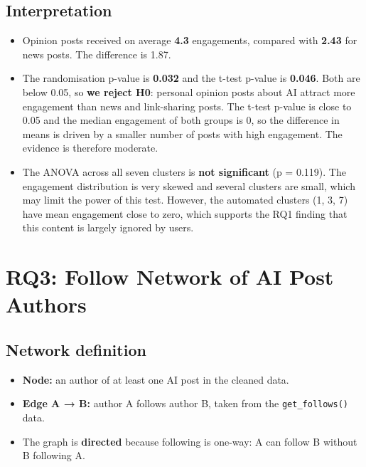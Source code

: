 \documentclass[
  10pt,
]{article}
\providecommand{\tightlist}{%
  \setlength{\itemsep}{0pt}\setlength{\parskip}{0pt}}
\begin{document}
\subsection{Interpretation}\label{interpretation-1}

\begin{itemize}
\tightlist
\item
  Opinion posts received on average \textbf{4.3} engagements, compared
  with \textbf{2.43} for news posts. The difference is 1.87.
\item
  The randomisation p-value is \textbf{0.032} and the t-test p-value is
  \textbf{0.046}. Both are below 0.05, so \textbf{we reject H0}:
  personal opinion posts about AI attract more engagement than news and
  link-sharing posts. The t-test p-value is close to 0.05 and the median
  engagement of both groups is 0, so the difference in means is driven
  by a smaller number of posts with high engagement. The evidence is
  therefore moderate.
\item
  The ANOVA across all seven clusters is \textbf{not significant} (p =
  0.119). The engagement distribution is very skewed and several
  clusters are small, which may limit the power of this test. However,
  the automated clusters (1, 3, 7) have mean engagement close to zero,
  which supports the RQ1 finding that this content is largely ignored by
  users.
\end{itemize}

\section{RQ3: Follow Network of AI Post
Authors}\label{rq3-follow-network-of-ai-post-authors}

\subsection{Network definition}\label{network-definition}

\begin{itemize}
\tightlist
\item
  \textbf{Node:} an author of at least one AI post in the cleaned data.
\item
  \textbf{Edge A → B:} author A follows author B, taken from the
  \texttt{get\_follows()} data.
\item
  The graph is \textbf{directed} because following is one-way: A can
  follow B without B following A.
\end{itemize}
\end{document}
